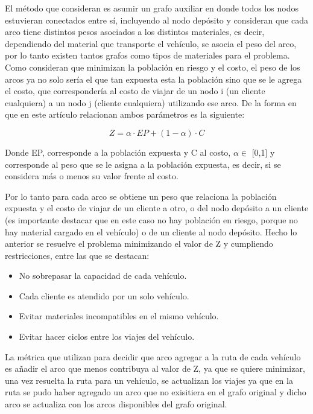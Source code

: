 \documentclass[conference]{IEEEtran}
\begin{document}
El m\'etodo que consideran es asumir un grafo auxiliar en donde todos los nodos estuvieran conectados entre s\'i, incluyendo al nodo dep\'osito y consideran que cada arco tiene distintos pesos asociados a los distintos materiales, es decir, dependiendo del material que transporte el veh\'iculo, se asocia el peso del arco, por lo tanto existen tantos grafos como tipos de materiales para el problema. Como consideran que minimizan la poblaci\'on en riesgo y el costo, el peso de los arcos ya no solo ser\'ia el que tan expuesta esta la poblaci\'on sino que se le agrega el costo, que corresponder\'ia al costo de viajar de un nodo i (un cliente cualquiera) a un nodo j (cliente cualquiera) utilizando ese arco. De la forma en que en este art\'iculo relacionan ambos par\'ametros es la siguiente: 

           \[Z = \alpha \cdot EP + (1 - \alpha) \cdot C\]
           
Donde EP, corresponde a la poblaci\'on expuesta y C al costo, $\alpha \in $ [0,1] y corresponde al peso que se le asigna a la poblaci\'on expuesta, es decir, si se considera m\'as o menos su valor frente al costo. 

Por lo tanto para cada arco se obtiene un peso que relaciona la poblaci\'on expuesta y el costo de viajar de un cliente a otro, o del nodo dep\'osito a un cliente (es importante destacar que en este caso no hay poblaci\'on en riesgo, porque no hay material cargado en el veh\'iculo) o de un cliente al nodo dep\'osito. Hecho lo anterior se resuelve el problema minimizando el valor de Z y cumpliendo restricciones, entre las que se destacan:

\begin{itemize}
    \item No sobrepasar la capacidad de cada veh\'iculo.
    \item Cada cliente es atendido por un solo veh\'iculo.
    \item Evitar materiales incompatibles en el mismo veh\'iculo.
    \item Evitar hacer ciclos entre los viajes del veh\'iculo.
\end{itemize}

La m\'etrica que utilizan para decidir que arco agregar a la ruta de cada veh\'iculo es a\~nadir el arco que menos contribuya al valor de Z, ya que se quiere minimizar, una vez resuelta la ruta para un veh\'iculo, se actualizan los viajes ya que en la ruta se pudo haber agregado un arco que no exisitiera en el grafo original y dicho arco se actualiza con los arcos disponibles del grafo original.
\\
\end{document}
